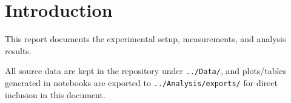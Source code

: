 \section{Introduction}

This report documents the experimental setup, measurements, and analysis results.

All source data are kept in the repository under \texttt{../Data/}, and plots/tables generated in notebooks are exported to \texttt{../Analysis/exports/} for direct inclusion in this document.
